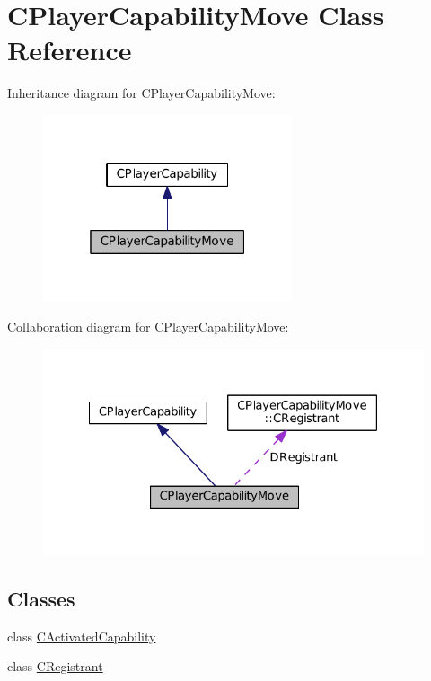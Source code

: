 \hypertarget{classCPlayerCapabilityMove}{}\section{C\+Player\+Capability\+Move Class Reference}
\label{classCPlayerCapabilityMove}


Inheritance diagram for C\+Player\+Capability\+Move\+:
\nopagebreak
\begin{figure}[H]
\begin{center}
\leavevmode
\includegraphics[width=208pt]{classCPlayerCapabilityMove__inherit__graph}
\end{center}
\end{figure}


Collaboration diagram for C\+Player\+Capability\+Move\+:
\nopagebreak
\begin{figure}[H]
\begin{center}
\leavevmode
\includegraphics[width=328pt]{classCPlayerCapabilityMove__coll__graph}
\end{center}
\end{figure}
\subsection*{Classes}
\begin{DoxyCompactItemize}
\item 
class \hyperlink{classCPlayerCapabilityMove_1_1CActivatedCapability}{C\+Activated\+Capability}
\item 
class \hyperlink{classCPlayerCapabilityMove_1_1CRegistrant}{C\+Registrant}
\end{DoxyCompactItemize}
